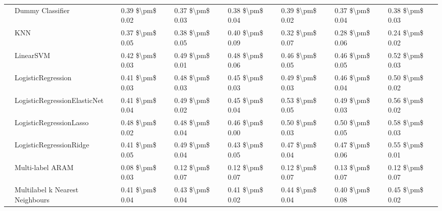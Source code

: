 \begin{tabular}{llllllll}
   & Dummy Classifier &  0.39 \$\textbackslash pm\$ 0.02 &           0.37 \$\textbackslash pm\$ 0.03 &       0.38 \$\textbackslash pm\$ 0.04 &        0.39 \$\textbackslash pm\$ 0.02 &                         0.37 \$\textbackslash pm\$ 0.04 &      0.38 \$\textbackslash pm\$ 0.03 \\
   & KNN &  0.37 \$\textbackslash pm\$ 0.05 &           0.38 \$\textbackslash pm\$ 0.05 &       0.40 \$\textbackslash pm\$ 0.09 &        0.32 \$\textbackslash pm\$ 0.07 &                         0.28 \$\textbackslash pm\$ 0.06 &      0.24 \$\textbackslash pm\$ 0.02 \\
   & LinearSVM &  0.42 \$\textbackslash pm\$ 0.03 &           0.49 \$\textbackslash pm\$ 0.01 &       0.48 \$\textbackslash pm\$ 0.06 &        0.46 \$\textbackslash pm\$ 0.05 &                         0.46 \$\textbackslash pm\$ 0.05 &      0.52 \$\textbackslash pm\$ 0.03 \\
   & LogisticRegression &  0.41 \$\textbackslash pm\$ 0.03 &           0.48 \$\textbackslash pm\$ 0.03 &       0.45 \$\textbackslash pm\$ 0.03 &        0.49 \$\textbackslash pm\$ 0.03 &                         0.46 \$\textbackslash pm\$ 0.04 &      0.50 \$\textbackslash pm\$ 0.02 \\
   & LogisticRegressionElasticNet &  0.41 \$\textbackslash pm\$ 0.04 &           0.49 \$\textbackslash pm\$ 0.02 &       0.45 \$\textbackslash pm\$ 0.04 &        0.53 \$\textbackslash pm\$ 0.05 &                         0.49 \$\textbackslash pm\$ 0.03 &      0.56 \$\textbackslash pm\$ 0.02 \\
   & LogisticRegressionLasso &  0.48 \$\textbackslash pm\$ 0.02 &           0.48 \$\textbackslash pm\$ 0.04 &       0.46 \$\textbackslash pm\$ 0.00 &        0.50 \$\textbackslash pm\$ 0.03 &                         0.50 \$\textbackslash pm\$ 0.05 &      0.58 \$\textbackslash pm\$ 0.03 \\
   & LogisticRegressionRidge &  0.41 \$\textbackslash pm\$ 0.05 &           0.49 \$\textbackslash pm\$ 0.04 &       0.43 \$\textbackslash pm\$ 0.05 &        0.47 \$\textbackslash pm\$ 0.04 &                         0.47 \$\textbackslash pm\$ 0.06 &      0.55 \$\textbackslash pm\$ 0.01 \\
   & Multi-label ARAM &  0.08 \$\textbackslash pm\$ 0.03 &           0.12 \$\textbackslash pm\$ 0.07 &       0.12 \$\textbackslash pm\$ 0.07 &        0.12 \$\textbackslash pm\$ 0.07 &                         0.13 \$\textbackslash pm\$ 0.07 &      0.12 \$\textbackslash pm\$ 0.07 \\
   & Multilabel k Nearest Neighbours &  0.41 \$\textbackslash pm\$ 0.04 &           0.43 \$\textbackslash pm\$ 0.04 &       0.41 \$\textbackslash pm\$ 0.02 &        0.44 \$\textbackslash pm\$ 0.04 &                         0.40 \$\textbackslash pm\$ 0.08 &      0.45 \$\textbackslash pm\$ 0.02 \\

\end{tabular}
